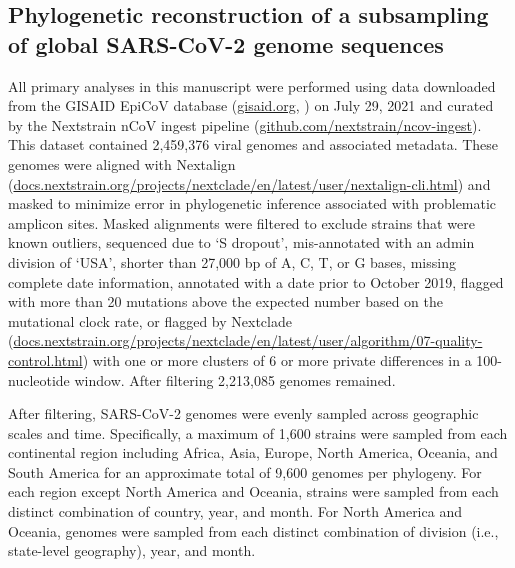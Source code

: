 \documentclass[11pt,oneside,letterpaper]{article}
\begin{document}
\subsection*{Phylogenetic reconstruction of a subsampling of global SARS-CoV-2 genome sequences}
All primary analyses in this manuscript were performed using data downloaded from the GISAID EpiCoV database (\href{https://gisaid.org}{gisaid.org}, \cite{Shu2017-ql}) on July 29, 2021 and curated by the Nextstrain nCoV ingest pipeline (\href{https://github.com/nextstrain/ncov-ingest}{github.com/nextstrain/ncov-ingest}).
This dataset contained 2,459,376 viral genomes and associated metadata.
These genomes were aligned with Nextalign (\href{https://docs.nextstrain.org/projects/nextclade/en/latest/user/nextalign-cli.html}{docs.nextstrain.org/projects/nextclade/en/latest/user/nextalign-cli.html}) and masked to minimize error in phylogenetic inference associated with problematic amplicon sites.
Masked alignments were filtered to exclude strains that were known outliers, sequenced due to `S dropout', mis-annotated with an admin division of `USA', shorter than 27,000 bp of A, C, T, or G bases, missing complete date information, annotated with a date prior to October 2019, flagged with more than 20 mutations above the expected number based on the mutational clock rate, or flagged by Nextclade (\href{https://docs.nextstrain.org/projects/nextclade/en/latest/user/algorithm/07-quality-control.html}{docs.nextstrain.org/projects/nextclade/en/latest/user/algorithm/07-quality-control.html}) with one or more clusters of 6 or more private differences in a 100-nucleotide window.
After filtering 2,213,085 genomes remained.

After filtering, SARS-CoV-2 genomes were evenly sampled across geographic scales and time. Specifically, a maximum of 1,600 strains were sampled from each continental region including Africa, Asia, Europe, North America, Oceania, and South America for an approximate total of 9,600 genomes per phylogeny.
For each region except North America and Oceania, strains were sampled from each distinct combination of country, year, and month.
For North America and Oceania, genomes were sampled from each distinct combination of division (i.e., state-level geography), year, and month.
\end{document}
